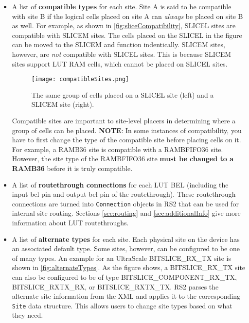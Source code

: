 \begin{itemize}
  \item A list of \textbf{compatible types} for each site. Site A is said to be
  compatible with site B if the logical cells placed on site A can
  \textit{always} be placed on site B as well. For example, as shown in
  \autoref{fig:sliceCompatibility}, SLICEL sites are compatible with SLICEM
  sites. The cells placed on the SLICEL in the figure can be moved to the
  SLICEM and function indentically. SLICEM sites, however, are \textit{not}
  compatible with SLICEL sites. This is because SLICEM sites support LUT RAM
  cells, which cannot be placed on SLICEL sites.
  
  \begin{figure}[H]
    \centering
    \texttt{[image: compatibleSites.png]}
    \caption{The same group of cells placed on a SLICEL site (left) and a SLICEM
    site (right).}
    \label{fig:sliceCompatibility}
  \end{figure}
  
  \noindent Compatible sites are important
  to site-level placers in determining where a group of cells can be placed.
  \textbf{NOTE}: In some instances of compatibility, you have to first change
  the type of the compatible site before placing cells on it. For example, a
  RAMB36 site is compatible with a RAMBFIFO36 site. However, the site type of
  the RAMBFIFO36 site \textbf{must be changed to a RAMB36} before it is
  truly compatible.
  
  \item A list of \textbf{routethrough connections} for each LUT BEL (including
  the input bel-pin and output bel-pin of the routethrough). These routethrough
  connections are turned into \texttt{Connection} objects in RS2 that
  can be used for internal site routing. Sections \ref{sec:routing} and
  \ref{sec:additionalInfo} give more information about LUT routethroughs.
  
  \item A list of \textbf{alternate types} for each site. Each physical site on
  the device has an associated default type. Some sites, however, can be
  configured to be one of many types. An example for an UltraScale
  BITSLICE\_RX\_TX site is shown in \autoref{fig:alternateTypes}. As the figure
  shows, a BITSLICE\_RX\_TX site can also be configured to be of type
  BITSLICE\_COMPONENT\_RX\_TX, BITSLICE\_RXTX\_RX, or BITSLICE\_RXTX\_TX.
  RS2 parses the alternate site information from the XML and applies it
  to the corresponding \texttt{Site} data structure. This allows users to change
  site types based on what they need.
  

\end{itemize}
